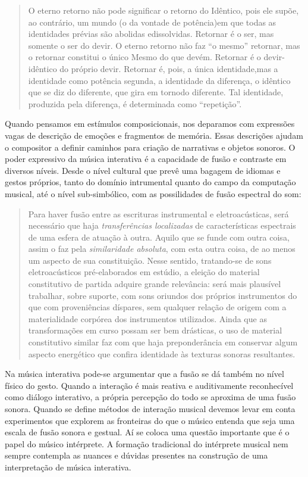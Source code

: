\documentclass{ppgmus}
\begin{document}
\begin{quote}
O eterno retorno não pode significar o retorno do Idêntico, pois ele supõe, 
ao contrário, um mundo (o da vontade de potência)em que todas as identidades 
prévias são abolidas edissolvidas. Retornar é o ser, mas somente o ser do devir. 
O eterno retorno não faz “o mesmo” retornar, mas o retornar constitui o único 
Mesmo do que devém. Retornar é o devir-idêntico do próprio devir. Retornar é, 
pois, a única identidade,mas a identidade como potência segunda, a identidade da 
diferença, o idêntico que se diz do diferente, que gira em tornodo diferente. 
Tal identidade, produzida pela diferença, é determinada como “repetição”. \cite{ferraz1998musica}
\end{quote}


Quando pensamos em estímulos composicionais, nos deparamos com expressões
vagas de descrição de emoções e fragmentos de memória. Essas descrições
ajudam o compositor a definir caminhos para criação de narrativas e 
objetos sonoros. O poder expressivo da música interativa é a capacidade
de fusão e contraste em diversos níveis. Desde o nível cultural que prevê
uma bagagem de idiomas e gestos próprios, tanto do domínio intrumental quanto
do campo da computação musical, até o nível sub-simbólico, com as possilidades
de fusão espectral do som:

\begin{quote}

Para haver fusão entre as escrituras instrumental e eletroacústicas,
será necessário que haja \textit{transferências localizadas} de 
características espectrais de uma esfera de atuação à outra.
Aquilo que se funde com outra coisa, assim o faz pela \textit{similaridade
absoluta}, com esta outra coisa, de ao menos um aspecto de sua 
constituição. Nesse sentido, tratando-se de sons eletroacústicos 
pré-elaborados em estúdio, a eleição do material constitutivo de partida
adquire grande relevância: será mais plausível trabalhar, sobre suporte,
com sons oriundos dos próprios instrumentos do que com proveniências
díspares, sem qualquer relação de origem com a materialidade corpórea
dos instrumentos utilizados. Ainda que as transformações em curso possam ser
bem drásticas, o uso de material constitutivo similar faz com que
haja preponderância em conservar algum aspecto energético que confira
identidade às texturas sonoras resultantes. \cite{menezes2006musica}
\end{quote}


Na música interativa pode-se argumentar que a fusão se dá também no nível
físico do gesto. Quando a interação é mais reativa e auditivamente reconhecível
como diálogo interativo, a própria percepção do todo se aproxima de uma
fusão sonora. Quando se define métodos de interação musical devemos levar
em conta experimentos que explorem as fronteiras do que o músico entenda
que seja uma escala de fusão sonora e gestual. Aí se coloca uma questão
importante que é o papel do músico intérprete. A formação tradicional
do intérprete musical nem sempre contempla as nuances e dúvidas presentes na construção
de uma interpretação de música interativa. 
\end{document}
